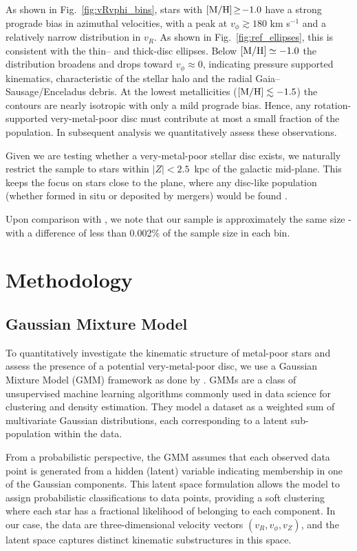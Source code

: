 \documentclass[a4paper,12pt]{article}
\begin{document}
As shown in Fig.~\ref{fig:vRvphi_bins}, stars with
${\rm[M/H]}\!\geq\!-1.0$ have a strong prograde bias in azimuthal velocities, 
with a peak at $v_\phi\!\gtrsim\!180$ km s$^{-1}$ and a relatively narrow
distribution in $v_R$. As shown in Fig.~\ref{fig:ref_ellipses}, this is consistent with 
the thin– and thick-disc ellipses. 
Below ${\rm[M/H]}\simeq-1.0$ the distribution broadens and
drops toward $v_\phi\!\approx\!0$, indicating
pressure supported kinematics, characteristic of the stellar halo and
the radial Gaia–Sausage/Enceladus debris.  At the lowest
metallicities (${\rm[M/H]}\lesssim-1.5$) the contours are nearly
isotropic with only a mild prograde bias.  Hence, any
rotation-supported very-metal-poor disc must contribute at most a
small fraction of the population. In subsequent analysis we quantitatively assess
these observations.

Given we are testing whether a very-metal-poor stellar disc exists, we naturally 
restrict the sample to stars within \mbox{$|Z|<2.5$ kpc} of the galactic mid-plane. 
This keeps the focus on stars close to the plane, where any disc-like population 
(whether formed in situ or deposited by mergers) would be found \citep{Tkachenko_2025}.

Upon comparison with \citet{zhang2024existencemetalpoordiscmilky}, we note that our 
sample is approximately the same size - with a difference of less than 0.002\% of the sample size in each bin.



\section{Methodology}

\subsection{Gaussian Mixture Model}

To quantitatively investigate the kinematic structure of metal-poor stars and assess 
the presence of a potential very-metal-poor disc, we use a Gaussian Mixture Model (GMM) framework
 as done by \citet{zhang2024existencemetalpoordiscmilky}. 
GMMs are a class of unsupervised machine learning algorithms commonly used in data science 
for clustering and density estimation. They model a dataset as a weighted sum of multivariate 
Gaussian distributions, each corresponding to a latent sub-population within the data.

From a probabilistic perspective, the GMM assumes that each observed data point is generated from a 
hidden (latent) variable indicating membership in one of the Gaussian components. This latent space 
formulation allows the model to assign probabilistic classifications to data points, providing a 
soft clustering where each star has a fractional likelihood of belonging to each component. In our case, 
the data are three-dimensional velocity vectors $(v_R, v_\phi, v_Z)$, and the latent space captures 
distinct kinematic substructures in this space.
\end{document}
